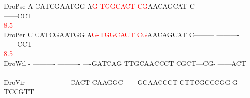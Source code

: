 \documentclass[11pt,twoside,reqno,a4paper]{article}
\begin{document}
{DroPse	A	CATCGAATGG	A\textcolor{Red}{G}\textcolor{Red}{-}\textcolor{Red}{T}\textcolor{Red}{G}\textcolor{Red}{G}\textcolor{Red}{C}\textcolor{Red}{A}\textcolor{Red}{C}\textcolor{Red}{T}	\textcolor{Red}{C}\textcolor{Red}{G}AACAGCAT	C---------	----------	------CCT\\
\hspace*{7\charwidth}\hspace*{1\charwidth}\hspace*{1\charwidth}\hspace*{12\charwidth}\textcolor{Red}{8.5}\hspace*{1\charwidth}\hspace*{1\charwidth}\hspace*{1\charwidth}\hspace*{1\charwidth}\\
DroPer	C	CATCGAATGG	A\textcolor{Red}{G}\textcolor{Red}{-}\textcolor{Red}{T}\textcolor{Red}{G}\textcolor{Red}{G}\textcolor{Red}{C}\textcolor{Red}{A}\textcolor{Red}{C}\textcolor{Red}{T}	\textcolor{Red}{C}\textcolor{Red}{G}AACAGCAT	C---------	----------	------CCT\\
\hspace*{7\charwidth}\hspace*{1\charwidth}\hspace*{1\charwidth}\hspace*{12\charwidth}\textcolor{Red}{8.5}\hspace*{1\charwidth}\hspace*{1\charwidth}\hspace*{1\charwidth}\hspace*{1\charwidth}\\
DroWil	-	----------	----------	----GATCAG	TTGCAACCCT	CGCT---CG-	------ACT\\
\hspace*{7\charwidth}\hspace*{1\charwidth}\hspace*{1\charwidth}\hspace*{1\charwidth}\hspace*{1\charwidth}\hspace*{1\charwidth}\hspace*{1\charwidth}\\
DroVir	-	----------	------CACT	CAAGGC----	--GCAACCCT	CTTCGCCCGG	G--TCCGTT\\
\hspace*{7\charwidth}\hspace*{1\charwidth}\hspace*{1\charwidth}\hspace*{1\charwidth}\hspace*{1\charwidth}\hspace*{1\charwidth}\hspace*{1\charwidth}\\
}
\end{document}
